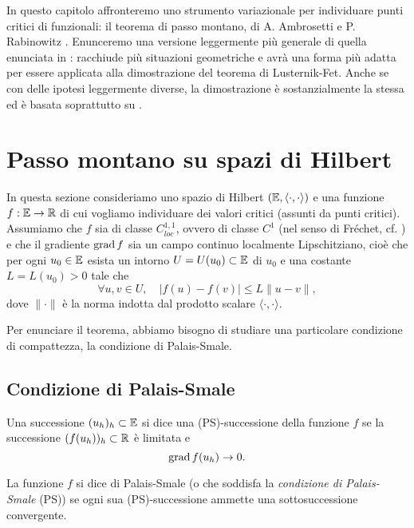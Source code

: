
In questo capitolo affronteremo uno strumento variazionale per individuare punti critici di funzionali: il teorema di passo montano, di A. Ambrosetti e P. Rabinowitz \cite{ambrosetti1973dual}. Enunceremo una versione leggermente più generale di quella enunciata in \cite[Section.81]{ambrosetti2007nonlinear}: racchiude più situazioni geometriche e avrà una forma più adatta per essere applicata alla dimostrazione del teorema di Lusternik-Fet. Anche se con delle ipotesi leggermente diverse, la dimostrazione è sostanzialmente la stessa ed è basata soprattutto su \cite[Chapter~7]{ambrosetti2007nonlinear}.

\section{Passo montano su spazi di Hilbert}

	
	In questa sezione consideriamo uno spazio di Hilbert \((\mathbb{E}, \langle \cdot, \cdot \rangle)\) e una funzione \(f: \mathbb{E} \to \mathbb{R}\) di cui vogliamo individuare dei valori critici (assunti da punti critici). 
	Assumiamo che \(f\) sia di classe \(C^{1,1}_{loc}\), ovvero di classe \(C^1\) (nel senso di Fréchet, cf. \cite[Definition~1.1]{ambrosetti2007nonlinear}) e che il gradiente \(\operatorname{grad} f\) sia un campo continuo localmente Lipschitziano, cioè che per ogni \(u_0 \in \mathbb{E}\) esista un intorno \(U=U(u_0) \subset \mathbb{E}\) di \(u_0\) e una costante \(L=L(u_0)>0\) tale che
	\[
	\forall u,v \in U, \quad |f(u)-f(v)| \leq L \|u-v\|,
	\]
	dove \(\|\cdot\|\) è la norma indotta dal prodotto scalare \(\langle \cdot,\cdot\rangle\). 
	
	Per enunciare il teorema, abbiamo bisogno di studiare una particolare condizione di compattezza, la condizione di Palais-Smale.
	
	\subsection{Condizione di Palais-Smale}
	
	\begin{defi}
		Una successione \((u_h)_h \subset \mathbb{E}\) si dice una (PS)-successione della funzione \(f\) se la successione \((f(u_h))_h \subset \mathbb{R}\) è limitata e 
		\[
		\operatorname{grad} f (u_h) \to 0.
		\]
		
		La funzione \(f\) si dice di Palais-Smale (o che soddisfa la \textit{condizione di Palais-Smale} (PS)) se ogni sua (PS)-successione ammette una sottosuccessione convergente. 
	\end{defi}
	
